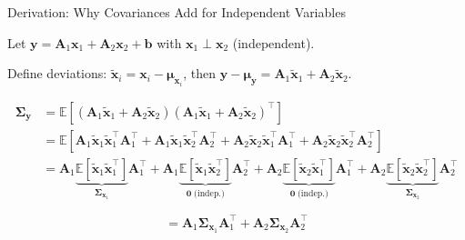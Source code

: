 \documentclass[aspectratio=169, 11pt]{beamer}
\newcommand{\E}{\mathbb{E}}
\newcommand{\T}{^{\top}}
\begin{document}
\begin{frame}{Derivation: Why Covariances Add for Independent Variables}

Let $\mathbf{y} = \mathbf{A}_1 \mathbf{x}_1 + \mathbf{A}_2 \mathbf{x}_2 + \mathbf{b}$ with $\mathbf{x}_1 \perp \mathbf{x}_2$ (independent).

\vspace{4pt}

Define deviations: $\tilde{\mathbf{x}}_i = \mathbf{x}_i - \bm{\mu}_{\mathbf{x}_i}$, \; then $\mathbf{y} - \bm{\mu}_{\mathbf{y}} = \mathbf{A}_1 \tilde{\mathbf{x}}_1 + \mathbf{A}_2 \tilde{\mathbf{x}}_2$.

\begin{align*}
\bm{\Sigma}_{\mathbf{y}}
  &= \E\!\left[(\mathbf{A}_1 \tilde{\mathbf{x}}_1 + \mathbf{A}_2 \tilde{\mathbf{x}}_2)
    (\mathbf{A}_1 \tilde{\mathbf{x}}_1 + \mathbf{A}_2 \tilde{\mathbf{x}}_2)\T\right] \\[6pt]
  &= \E\!\left[
    \mathbf{A}_1 \tilde{\mathbf{x}}_1 \tilde{\mathbf{x}}_1\T \mathbf{A}_1\T
    + \mathbf{A}_1 \tilde{\mathbf{x}}_1 \tilde{\mathbf{x}}_2\T \mathbf{A}_2\T
    + \mathbf{A}_2 \tilde{\mathbf{x}}_2 \tilde{\mathbf{x}}_1\T \mathbf{A}_1\T
    + \mathbf{A}_2 \tilde{\mathbf{x}}_2 \tilde{\mathbf{x}}_2\T \mathbf{A}_2\T
    \right] \\[6pt]
  &= \mathbf{A}_1 \underbrace{\E[\tilde{\mathbf{x}}_1\tilde{\mathbf{x}}_1\T]}_{\bm{\Sigma}_{\mathbf{x}_1}} \mathbf{A}_1\T
    + \mathbf{A}_1 \underbrace{\E[\tilde{\mathbf{x}}_1\tilde{\mathbf{x}}_2\T]}_{\mathbf{0}\;\text{(indep.)}} \mathbf{A}_2\T
    + \mathbf{A}_2 \underbrace{\E[\tilde{\mathbf{x}}_2\tilde{\mathbf{x}}_1\T]}_{\mathbf{0}\;\text{(indep.)}} \mathbf{A}_1\T
    + \mathbf{A}_2 \underbrace{\E[\tilde{\mathbf{x}}_2\tilde{\mathbf{x}}_2\T]}_{\bm{\Sigma}_{\mathbf{x}_2}} \mathbf{A}_2\T
\end{align*}

$$= \boxed{\mathbf{A}_1 \bm{\Sigma}_{\mathbf{x}_1} \mathbf{A}_1\T + \mathbf{A}_2 \bm{\Sigma}_{\mathbf{x}_2} \mathbf{A}_2\T}$$

\end{frame}
\end{document}
